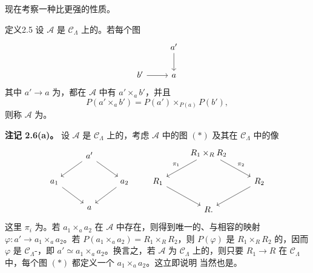 现在考察一种比更强的性质。
\begin{SGAresult}{定义}{2.5}
设 $\mathcal A$ 是 $\mathcal C_\Lambda$ 上的。若每个图
\[
\begin{tikzcd}&a'\arrow[d]\\b'\arrow[r]&a\end{tikzcd}
\]
其中 $a'\to a$ 为，都在 $\mathcal A$ 中有 $a'\times_a b'$，并且
\[P(a'\times_a b')=P(a')\times_{P(a)}P(b'),\]
则称 $\mathcal A$ 为。
\end{SGAresult}
\textbf{注记 2.6(a)。} 设 $\mathcal A$ 是 $\mathcal C_\Lambda$ 上的，考虑 $\mathcal A$ 中的图 $(*)$ 及其在 $\mathcal C_\Lambda$ 中的像
\[
\begin{tikzcd}&a'\arrow[dl]\arrow[dr]\\a_1\arrow[dr]&&a_2\arrow[dl]\\&a\end{tikzcd}
\qquad
\begin{tikzcd}&R_1\times_R R_2\arrow[dl,"\pi_1"']\arrow[dr,"\pi_2"]\\R_1\arrow[dr]&&R_2\arrow[dl]\\&R.\end{tikzcd}
\]
这里 $\pi_i$ 为。若 $a_1\times_a a_2$ 在 $\mathcal A$ 中存在，则得到唯一的、与相容的映射 $\varphi:a'\to a_1\times_a a_2$。若 $P(a_1\times_a a_2)=R_1\times_R R_2$，则 $P(\varphi)$ 是 $R_1\times_R R_2$ 的，因而 $\varphi$ 是 $\mathcal C_\Lambda$-，即 $a'\simeq a_1\times_a a_2$。换言之，若 $\mathcal A$ 为 $\mathcal C_\Lambda$ 上的，则只要 $R_1\to R$ 在 $\mathcal C_\Lambda$ 中，每个图 $(*)$ 都定义一个 $a_1\times_a a_2$。这立即说明
当然也是。


